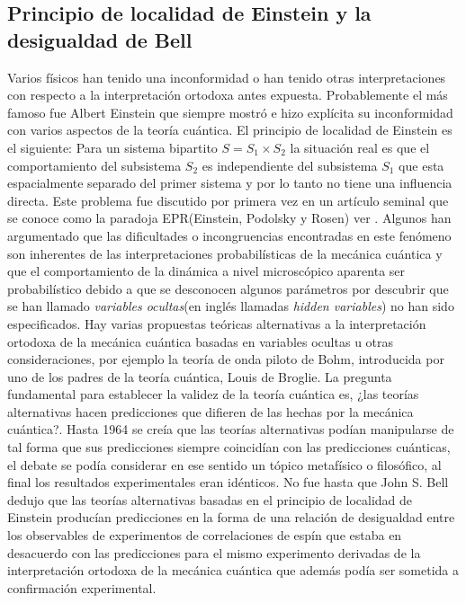 \documentclass[a4paper]{article}
\begin{document}
\subsection{Principio de localidad de Einstein y la desigualdad de Bell}
Varios físicos han tenido una inconformidad o han tenido otras interpretaciones con respecto a la interpretación ortodoxa antes expuesta. Probablemente el más famoso fue Albert Einstein que siempre mostró e hizo explícita su inconformidad con varios aspectos de la teoría cuántica. El principio de localidad de Einstein es el siguiente: Para un sistema bipartito $S=S_1 \times S_2$ la situación real es que el comportamiento del subsistema $S_2$ es independiente del subsistema $S_1$ que esta espacialmente separado del primer sistema y por lo tanto no tiene una influencia directa. Este problema fue discutido por primera vez en un artículo seminal que se conoce como la paradoja EPR(Einstein, Podolsky y Rosen) ver \cite{Einstein}. Algunos han argumentado que las dificultades o incongruencias encontradas en este fenómeno son inherentes de las interpretaciones probabilísticas de la mecánica cuántica y que el comportamiento de la dinámica a nivel microscópico aparenta ser probabilístico debido a que se desconocen algunos parámetros por descubrir que se han llamado \textit{variables ocultas}(en inglés llamadas \textit{hidden variables}) no han sido especificados. Hay varias propuestas teóricas alternativas a la interpretación ortodoxa de la mecánica cuántica basadas en variables ocultas u otras consideraciones, por ejemplo la teoría de onda piloto de Bohm, introducida por uno de los padres de la teoría cuántica, Louis de Broglie. La pregunta fundamental para establecer la validez de la teoría cuántica es, ¿las teorías alternativas hacen predicciones que difieren de las hechas por la mecánica cuántica?. Hasta 1964 se creía que las teorías alternativas podían manipularse de tal forma que sus predicciones siempre coincidían  con las predicciones cuánticas, el debate se podía considerar en ese sentido un tópico metafísico o filosófico, al final los resultados experimentales eran idénticos. No fue hasta que John S. Bell dedujo que las teorías alternativas basadas en el principio de localidad de Einstein producían predicciones en la forma de una relación de desigualdad entre los observables de experimentos de correlaciones de espín que estaba en desacuerdo con las predicciones para el mismo experimento derivadas de la interpretación ortodoxa de la mecánica cuántica que además podía ser sometida a confirmación experimental.\\
\end{document}
